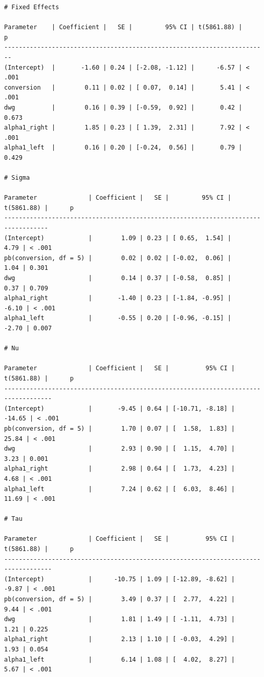 \documentclass[
]{article}
\begin{document}
\begin{verbatim}
# Fixed Effects

Parameter    | Coefficient |   SE |         95% CI | t(5861.88) |      p
------------------------------------------------------------------------
(Intercept)  |       -1.60 | 0.24 | [-2.08, -1.12] |      -6.57 | < .001
conversion   |        0.11 | 0.02 | [ 0.07,  0.14] |       5.41 | < .001
dwg          |        0.16 | 0.39 | [-0.59,  0.92] |       0.42 | 0.673 
alpha1_right |        1.85 | 0.23 | [ 1.39,  2.31] |       7.92 | < .001
alpha1_left  |        0.16 | 0.20 | [-0.24,  0.56] |       0.79 | 0.429 

# Sigma

Parameter              | Coefficient |   SE |         95% CI | t(5861.88) |      p
----------------------------------------------------------------------------------
(Intercept)            |        1.09 | 0.23 | [ 0.65,  1.54] |       4.79 | < .001
pb(conversion, df = 5) |        0.02 | 0.02 | [-0.02,  0.06] |       1.04 | 0.301 
dwg                    |        0.14 | 0.37 | [-0.58,  0.85] |       0.37 | 0.709 
alpha1_right           |       -1.40 | 0.23 | [-1.84, -0.95] |      -6.10 | < .001
alpha1_left            |       -0.55 | 0.20 | [-0.96, -0.15] |      -2.70 | 0.007 

# Nu

Parameter              | Coefficient |   SE |          95% CI | t(5861.88) |      p
-----------------------------------------------------------------------------------
(Intercept)            |       -9.45 | 0.64 | [-10.71, -8.18] |     -14.65 | < .001
pb(conversion, df = 5) |        1.70 | 0.07 | [  1.58,  1.83] |      25.84 | < .001
dwg                    |        2.93 | 0.90 | [  1.15,  4.70] |       3.23 | 0.001 
alpha1_right           |        2.98 | 0.64 | [  1.73,  4.23] |       4.68 | < .001
alpha1_left            |        7.24 | 0.62 | [  6.03,  8.46] |      11.69 | < .001

# Tau

Parameter              | Coefficient |   SE |          95% CI | t(5861.88) |      p
-----------------------------------------------------------------------------------
(Intercept)            |      -10.75 | 1.09 | [-12.89, -8.62] |      -9.87 | < .001
pb(conversion, df = 5) |        3.49 | 0.37 | [  2.77,  4.22] |       9.44 | < .001
dwg                    |        1.81 | 1.49 | [ -1.11,  4.73] |       1.21 | 0.225 
alpha1_right           |        2.13 | 1.10 | [ -0.03,  4.29] |       1.93 | 0.054 
alpha1_left            |        6.14 | 1.08 | [  4.02,  8.27] |       5.67 | < .001
\end{verbatim}
\end{document}
